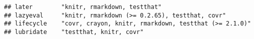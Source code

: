 \documentclass[]{book}
\begin{document}
\begin{verbatim}
## later        "knitr, rmarkdown, testthat"                                                                                                                                                                                                                                                                                                                                                                                                                                                                                                                                                                                                                                                                              
## lazyeval     "knitr, rmarkdown (>= 0.2.65), testthat, covr"                                                                                                                                                                                                                                                                                                                                                                                                                                                                                                                                                                                                                                                            
## lifecycle    "covr, crayon, knitr, rmarkdown, testthat (>= 2.1.0)"                                                                                                                                                                                                                                                                                                                                                                                                                                                                                                                                                                                                                                                     
## lubridate    "testthat, knitr, covr"                                                                                                                                                                                                                                                                                                                                                                                                                                                                                                                                                                                                                                                                                   

\end{verbatim}
\end{document}
